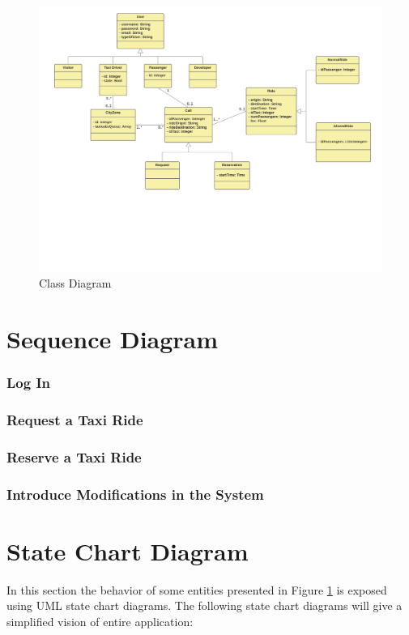 \begin{figure}[htbp]
\centering
\includegraphics[width=\textwidth]{cpt/img/ClassDiagram}
\caption{Class Diagram}
\label{fig:classdiag}
\end{figure}

\section{Sequence Diagram}

\subsubsection{Log In}

\subsubsection{Request a Taxi Ride}

\subsubsection{Reserve a Taxi Ride}

\subsubsection{Introduce Modifications in the System}

\section{State Chart Diagram}
In this section the behavior of some entities presented in Figure \ref{fig:classdiag} is exposed using UML state chart diagrams. The following state chart diagrams will give a simplified vision of entire application:

